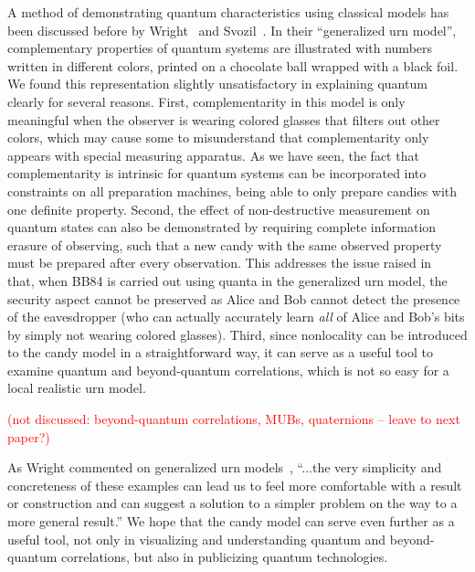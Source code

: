 \documentclass{article}
\def \todo #1{\textcolor{red}{#1}}
\begin{document}
A method of demonstrating quantum characteristics using classical models has been discussed before by Wright~\cite{wright1990generalized} and Svozil~\cite{svozil2006staging}. 
In their ``generalized urn model'', complementary properties of quantum systems are illustrated with numbers written in different colors, printed on a chocolate ball wrapped with a black foil.
We found this representation slightly unsatisfactory in explaining quantum clearly for several reasons.
First, complementarity in this model is only meaningful when the observer is wearing colored glasses that filters out other colors, which may cause some to misunderstand that complementarity only appears with special measuring apparatus.
As we have seen, the fact that complementarity is intrinsic for quantum systems can be incorporated into constraints on all preparation machines, being able to only prepare candies with one definite property.
Second, the effect of non-destructive measurement on quantum states can also be demonstrated by requiring complete information erasure of observing, such that a new candy with the same observed property must be prepared after every observation.
This addresses the issue raised in~\cite{Svozil2014} that, when BB84 is carried out using quanta in the generalized urn model, the security aspect cannot be preserved as Alice and Bob cannot detect the presence of the eavesdropper (who can actually accurately learn \textit{all} of Alice and Bob's bits by simply not wearing colored glasses).
Third, since nonlocality can be introduced to the candy model in a straightforward way, it can serve as a useful tool to examine quantum and beyond-quantum correlations, which is not so easy for a local realistic urn model.

\todo{(not discussed: beyond-quantum correlations, MUBs, quaternions -- leave to next paper?)}

As Wright commented on generalized urn models~\cite{wright1990generalized}, ``...the very simplicity and concreteness of these examples can lead us to feel more comfortable with a result or construction and can suggest a solution to a simpler problem on the way to a more general result.''
We hope that the candy model can serve even further as a useful tool, not only in visualizing and understanding quantum and beyond-quantum correlations, but also in publicizing quantum technologies.





\end{document}
